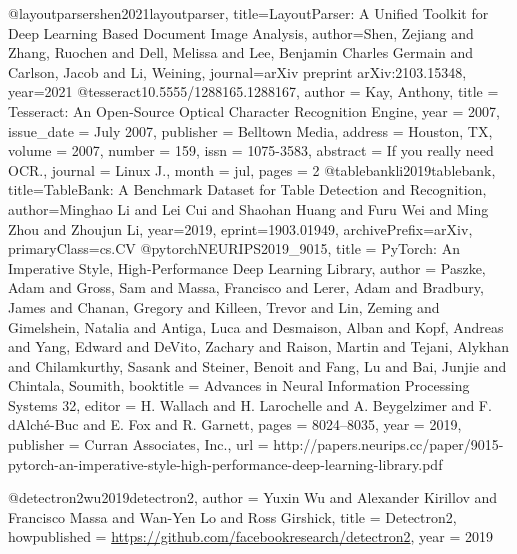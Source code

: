 @layoutparser{shen2021layoutparser,
  title={LayoutParser: A Unified Toolkit for Deep Learning Based Document Image Analysis},
  author={Shen, Zejiang and Zhang, Ruochen and Dell, Melissa and Lee, Benjamin Charles Germain and Carlson, Jacob and Li, Weining},
  journal={arXiv preprint arXiv:2103.15348},
  year={2021}
}
@tesseract{10.5555/1288165.1288167,
author = {Kay, Anthony},
title = {Tesseract: An Open-Source Optical Character Recognition Engine},
year = {2007},
issue_date = {July 2007},
publisher = {Belltown Media},
address = {Houston, TX},
volume = {2007},
number = {159},
issn = {1075-3583},
abstract = {If you really need OCR.},
journal = {Linux J.},
month = {jul},
pages = {2}
}
@tablebank{li2019tablebank,
    title={TableBank: A Benchmark Dataset for Table Detection and Recognition},
    author={Minghao Li and Lei Cui and Shaohan Huang and Furu Wei and Ming Zhou and Zhoujun Li},
    year={2019},
    eprint={1903.01949},
    archivePrefix={arXiv},
    primaryClass={cs.CV}
}
@pytorch{NEURIPS2019_9015,
title = {PyTorch: An Imperative Style, High-Performance Deep Learning Library},
author = {Paszke, Adam and Gross, Sam and Massa, Francisco and Lerer, Adam and Bradbury, James and Chanan, Gregory and Killeen, Trevor and Lin, Zeming and Gimelshein, Natalia and Antiga, Luca and Desmaison, Alban and Kopf, Andreas and Yang, Edward and DeVito, Zachary and Raison, Martin and Tejani, Alykhan and Chilamkurthy, Sasank and Steiner, Benoit and Fang, Lu and Bai, Junjie and Chintala, Soumith},
booktitle = {Advances in Neural Information Processing Systems 32},
editor = {H. Wallach and H. Larochelle and A. Beygelzimer and F. d\textquotesingle Alch\'{e}-Buc and E. Fox and R. Garnett},
pages = {8024--8035},
year = {2019},
publisher = {Curran Associates, Inc.},
url = {http://papers.neurips.cc/paper/9015-pytorch-an-imperative-style-high-performance-deep-learning-library.pdf}
}

@detectron2{wu2019detectron2,
  author =       {Yuxin Wu and Alexander Kirillov and Francisco Massa and
                  Wan-Yen Lo and Ross Girshick},
  title =        {Detectron2},
  howpublished = {\url{https://github.com/facebookresearch/detectron2}},
  year =         {2019}
}

